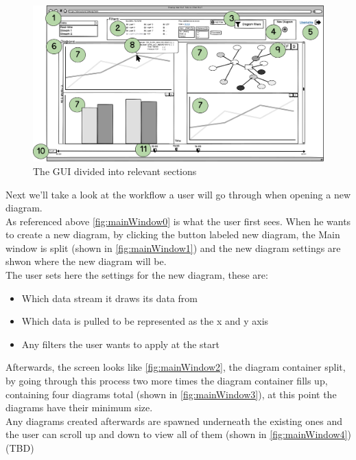 \documentclass[twoside, english, draft]{Pflichtenheft}
\begin{document}
\vfill

\begin{figure}[ht]
	\centering
	\includegraphics[width=\textwidth]{Images/07MW.png}
	\caption{The GUI divided into relevant sections}
	\label{fig:mainWindow5}
\end{figure}

\vfill
\clearpage

Next we'll take a look at the workflow a user will go through when opening a new diagram.
\\
As referenced above \autoref{fig:mainWindow0} is what the user first sees. When he wants to create a new diagram, by clicking the button labeled new diagram, the Main window is split (shown in \autoref{fig:mainWindow1}) and the new diagram settings are shwon where the new diagram will be.
\\
The user sets here the settings for the new diagram, these are:
\\
\begin{itemize}
	\item{Which data stream it draws its data from}
	\item{Which data is pulled to be represented as the x and y axis}
	\item{Any filters the user wants to apply at the start}
\end{itemize}

Afterwards, the screen looks like \autoref{fig:mainWindow2}, the \gls{diagram container} split, by going through this process two more times the diagram container fills up, containing four diagrams total (shown in \autoref{fig:mainWindow3}), at this point the diagrams have their minimum size.
\\
Any diagrams created afterwards are spawned underneath the existing ones and the user can scroll up and down to view all of them (shown in \autoref{fig:mainWindow4}) (TBD)
\end{document}
